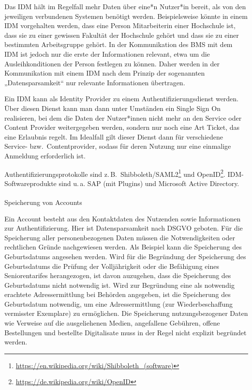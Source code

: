 \documentclass[
  11pt,
  letterpaper,
  DIV=11,
  twoside]{scrreprt}
\makeatletter
\let\oldparagraph\paragraph
\renewcommand{\paragraph}{
    \@ifstar
      \xxxParagraphStar
      \xxxParagraphNoStar
  }
\newcommand{\xxxParagraphStar}[1]{\oldparagraph*{#1}\mbox{}}
\newcommand{\xxxParagraphNoStar}[1]{\oldparagraph{#1}\mbox{}}
\DeclareRobustCommand{\href}[2]{#2\footnote{\url{#1}}}
\makeatother
\begin{document}
Das IDM hält im Regelfall mehr Daten über eine*n Nutzer*in bereit, als
von den jeweiligen verbundenen Systemen benötigt werden. Beispielsweise
könnte in einem IDM vorgehalten werden, dass eine Person Mitarbeiterin
einer Hochschule ist, dass sie zu einer gewissen Fakultät der Hochschule
gehört und dass sie zu einer bestimmten Arbeitsgruppe gehört. In der
Kommunikation des BMS mit dem IDM ist jedoch nur die erste der
Informationen relevant, etwa um die Ausleihkonditionen der Person
festlegen zu können. Daher werden in der Kommunikation mit einem IDM
nach dem Prinzip der sogenannten „Datensparsamkeit`` nur relevante
Informationen übertragen.

Ein IDM kann als Identity Provider zu einem Authentifizierungsdienst
werden. Über diesen Dienst kann man dann unter Umständen ein Single Sign
On realisieren, bei dem die Daten der Nutzer*innen nicht mehr an den
Service oder Content Provider weitergegeben werden, sondern nur noch
eine Art Ticket, das eine Erlaubnis regelt. Im Idealfall gilt dieser
Dienst dann für verschiedene Service- bzw.~Contentprovider, sodass für
deren Nutzung nur eine einmalige Anmeldung erforderlich ist.

Authentifizierungsprotokolle sind
z.\,B.~\href{https://en.wikipedia.org/wiki/Shibboleth_(software)}{Shibboleth/SAML2}
und \href{https://de.wikipedia.org/wiki/OpenID}{OpenID}.
IDM-Softwareprodukte sind u.\,a. SAP (mit Plugins) und Microsoft Active
Directory.

\paragraph{Speicherung von Accounts}\label{speicherung-von-accounts}

Ein Account besteht aus den Kontaktdaten des Nutzenden sowie
Informationen zur Authentifizierung. Hier ist Datensparsamkeit nach
DSGVO geboten. Für die Speicherung aller personenbezogenen Daten müssen
die Notwendigkeiten oder rechtlichen Gründe nachgewiesen werden. Als
Beispiel kann die Speicherung des Geburtsdatums angesehen werden. Wird
für die Begründung der Speicherung des Geburtsdatums die Prüfung der
Volljährigkeit oder die Befähigung eines Seniorentarifes herangezogen,
ist davon auzugehen, dass die Speicherung des Geburtsdatums nicht
notwendig ist. Wird zur Begründung eine als notwendig erachtete
Adressermittlung bei Behörden angegeben, ist die Speicherung des
Geburtsdatum notwendig, um eine Adressermittlung (zur Wiederbeschaffung
vermisster Exemplare) zu ermöglichen. Die Speicherung nutzungsbezogener
Daten wie Verweise auf die ausgeliehenen Medien, angefallene Gebühren,
offene Bestellungen und bestellte Digitalisate muss in der Regel nicht
explizit begründet werden.
\end{document}
